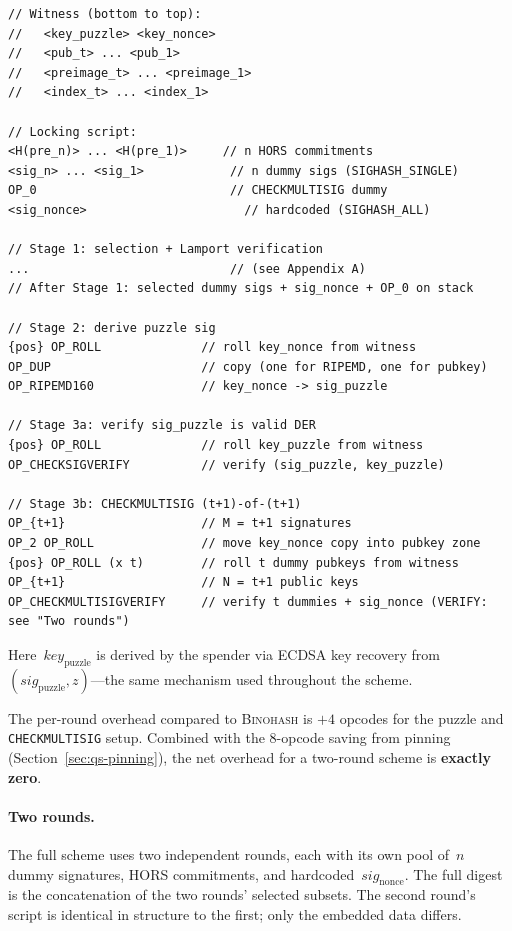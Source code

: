 \documentclass[11pt, a4paper]{article}
\begin{document}
\begin{lstlisting}[language={}, numbers=none]
// Witness (bottom to top):
//   <key_puzzle> <key_nonce>
//   <pub_t> ... <pub_1>
//   <preimage_t> ... <preimage_1>
//   <index_t> ... <index_1>

// Locking script:
<H(pre_n)> ... <H(pre_1)>     // n HORS commitments
<sig_n> ... <sig_1>            // n dummy sigs (SIGHASH_SINGLE)
OP_0                           // CHECKMULTISIG dummy
<sig_nonce>                      // hardcoded (SIGHASH_ALL)

// Stage 1: selection + Lamport verification
...                            // (see Appendix A)
// After Stage 1: selected dummy sigs + sig_nonce + OP_0 on stack

// Stage 2: derive puzzle sig
{pos} OP_ROLL              // roll key_nonce from witness
OP_DUP                     // copy (one for RIPEMD, one for pubkey)
OP_RIPEMD160               // key_nonce -> sig_puzzle

// Stage 3a: verify sig_puzzle is valid DER
{pos} OP_ROLL              // roll key_puzzle from witness
OP_CHECKSIGVERIFY          // verify (sig_puzzle, key_puzzle)

// Stage 3b: CHECKMULTISIG (t+1)-of-(t+1)
OP_{t+1}                   // M = t+1 signatures
OP_2 OP_ROLL               // move key_nonce copy into pubkey zone
{pos} OP_ROLL (x t)        // roll t dummy pubkeys from witness
OP_{t+1}                   // N = t+1 public keys
OP_CHECKMULTISIGVERIFY     // verify t dummies + sig_nonce (VERIFY: see "Two rounds")
\end{lstlisting}

\noindent Here~$\mathit{key}_{\mathrm{puzzle}}$ is derived by the spender via ECDSA key recovery from~$(\mathit{sig}_{\mathrm{puzzle}}, z)$---the same mechanism used throughout the scheme.

The per-round overhead compared to \textsc{Binohash} is $+4$ opcodes for the puzzle and \texttt{CHECKMULTISIG} setup. Combined with the 8-opcode saving from pinning (Section~\ref{sec:qs-pinning}), the net overhead for a two-round scheme is \textbf{exactly zero}.

\paragraph{Two rounds.}
The full scheme uses two independent rounds, each with its own pool of~$n$ dummy signatures, HORS commitments, and hardcoded~$\mathit{sig}_{\mathrm{nonce}}$. The full digest is the concatenation of the two rounds' selected subsets. The second round's script is identical in structure to the first; only the embedded data differs.
\end{document}
